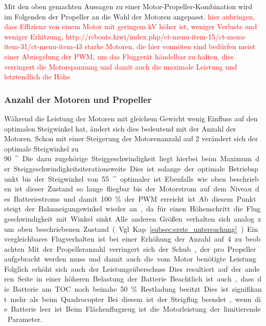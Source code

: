 Mit den oben gemachten Aussagen zu einer Motor-Propeller-Kombination wird im Folgenden der Propeller an die Wahl der Motoren angepasst.
\textcolor{red}{hier anbringen, dass Effizienz von einem Motor mit geringem kV höher ist, weniger Verluste und weniger Erhitzung, 
http://rcboats.kiwi/index.php/ct-menu-item-15/ct-menu-item-31/ct-menu-item-43}
\textcolor{red}{starke Motoren, die hier vonnöten sind bedürfen meist einer Abriegelung der PWM, um das Fluggerät händelbar zu halten, dies verringert die Motorspannung und damit auch die maximale Leistung und letztendlich die Höhe}


\subsubsection{Anzahl der Motoren und Propeller}
Während die Leistung der Motoren mit gleichem Gewicht wenig Einfluss auf den optimalen Steigwinkel hat, ändert sich dies bedeutend mit der Anzahl der Motoren. Schon mit einer Steigerung der Motorenanzahl auf 2 verändert sich der optimale Steigwinkel zu \SI{90}{^\circ}. Die dazu zugehörige Steiggeschwindigkeit liegt hierbei beim Maximum der Steiggeschwindigkeitsiterationsweite. Dies ist solange der optimale Betriebspunkt bis der Steigwinkel von \SI{55}{^\circ} optimaler ist.
Ebenfalls wie oben beschrieben ist dieser Zustand so lange fliegbar bis der Motorstrom auf dem Niveau des Batteriestroms und damit \SI{100}{\%} der PWM erreicht ist. Ab diesem Punkt steigt der Bahnneigungswinkel wieder an, da für einen Höhenschritt die Fluggeschwindigkeit mit Winkel sinkt. Alle anderen Größen verhalten sich analog zum oben beschriebenen Zustand (Vgl. Kap. \ref{subsec:erste_untersuchung}). Ein vergleichbares Flugverhalten ist bei einer Erhöhung der Anzahl auf 4 zu beobachten.
Mit der Propelleranzahl verringert sich der Schub, der pro Propeller aufgebracht werden muss und damit auch die vom Motor benötigte Leistung. Folglich erhöht sich auch der Leistungsüberschuss. Dies resultiert auf der anderen Seite in einer höheren Belastung der Batterie. Beachtlich ist auch, dass die Batterie am TOC noch beinahe \SI{50}{\%} Restladung besitzt. Dies ist signifikant mehr als beim Quadrocopter. Bei diesem ist der Steigflug beendet, wenn die Batterie leer ist. Beim Flächenflugzeug ist die Motorleistung der limitierende Parameter.

